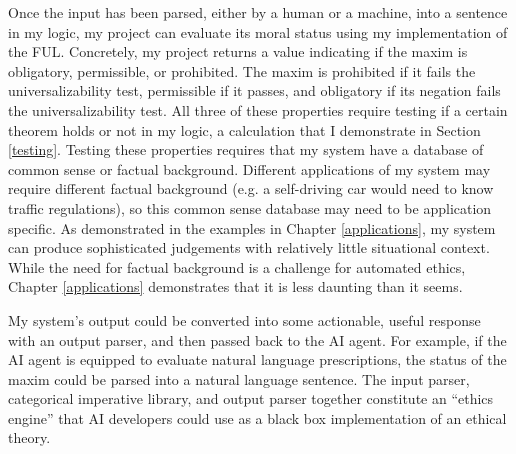 \begin{isabellebody}
\begin{isamarkuptext}
Once the input has been parsed, either by a human or a machine, into  a sentence in my logic, my 
project can evaluate its moral status using my implementation of 
the FUL. Concretely, my project returns a value indicating if the maxim is obligatory, permissible, 
or prohibited. The maxim is prohibited if it fails the universalizability test, permissible if it passes, and obligatory 
if its negation fails the universalizability test. All three of these properties require testing if a 
certain theorem holds or not in my logic, a calculation that I demonstrate in Section \ref{testing}. 
Testing these properties requires that my system have a database of common sense or factual background. 
Different applications of my system may require different factual background (e.g. a self-driving car 
would need to know traffic regulations), so this common sense database may need to be application 
specific. As demonstrated in the examples in Chapter \ref{applications}, my system can produce sophisticated 
judgements with relatively little situational context. While the need for factual background is a challenge
for automated ethics, Chapter \ref{applications} demonstrates that it is less daunting than it seems. 

My system's output could be converted into some actionable, useful response with an output parser, 
and then passed back to the AI agent. For example, if the AI agent is equipped to evaluate natural 
language prescriptions, the status of the maxim could be parsed into a natural language sentence. The 
input parser, categorical imperative library, and output parser together constitute an ``ethics engine'' 
that AI developers could use as a black box implementation of an ethical theory. 


\end{isamarkuptext}
\end{isabellebody}
